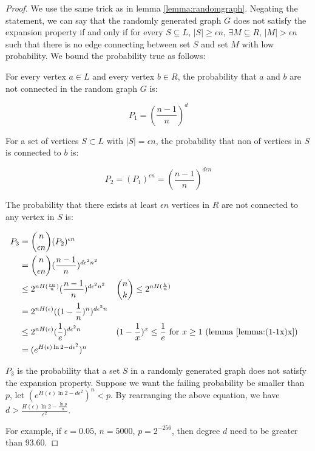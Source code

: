\begin{proof}

We use the same trick as in lemma \ref{lemma:randomgraph}. Negating the statement, we can say that the randomly generated graph $G$ does not satisfy the expansion property if and only if 
for every $ S \subseteq L$, $|S| \ge \epsilon n$, $\exists M \subseteq R$, $|M| > \epsilon n$ such that there is no edge connecting between set $S$ and set $M$ with low probability. 
We bound the probability true as follows:

For every vertex $a \in L$ and every vertex $b \in R$, the probability that $a$ and $b$ are not connected in the random graph $G$ is:

$$P_1 = (\frac{n-1}{n})^{d}$$

For a set of vertices $S \subset L$ with $|S| = \epsilon n$, the probability that non of vertices in $S$ is connected to $b$ is:

$$P_2 = (P_1)^{\epsilon n} = (\frac{n-1}{n})^{d\epsilon n}$$

The probability that there exists at least $\epsilon n$ vertices in $R$ are not connected to any vertex in $S$ is:

\begin{align}
P_3 &= \binom{n}{\epsilon n} (P_2)^{\epsilon n} \nonumber \\
    &= \binom{n}{\epsilon n} (\frac{n-1}{n})^{d \epsilon^2 n^2} \nonumber \\
    &\le 2^{n H(\frac{\epsilon n}{n})} (\frac{n-1}{n})^{d \epsilon^2 n^2} 
    && \binom{n}{k} \le 2^{n H(\frac{k}{n})} \nonumber \\
    &= 2^{n H(\epsilon)} ((1 - \frac{1}{n})^{n})^{d \epsilon^2 n} \nonumber \\
    &\le 2^{n H(\epsilon)} (\frac{1}{e})^{d \epsilon^2 n} 
    && (1 - \frac{1}{x})^x \le \frac{1}{e} \text{ for } x \ge 1 \text{ (lemma \ref{lemma:(1-1x)x})} \nonumber \\
    &= (e^{ H(\epsilon)\ln 2 - d \epsilon^2})^{n} \nonumber \\
\end{align}

$P_3$ is the probability that a set $S$ in a randomly generated graph does not satisfy the expansion property. Suppose we want the failing probability be smaller than $p$, let $(e^{ H(\epsilon)\ln 2 - d \epsilon^2})^{n} < p$.
By rearranging the above equation, we have $ d > \frac{H(\epsilon) \ln 2 - \frac{\ln p}{n}}{\epsilon^2}$.

For example, if $\epsilon = 0.05$, $n = 5000$, $p = 2^{-256}$, then degree $d$ need to be greater than $93.60$.


\end{proof}
